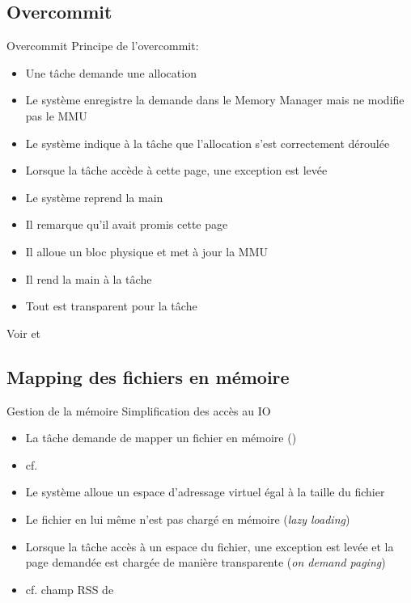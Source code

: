 \subsection{Overcommit}

\begin{frame}{Overcommit}
  Principe de l'overcommit:
  \begin{itemize}
  \item Une tâche demande une allocation
  \item Le système  enregistre la demande dans le  Memory Manager mais
    ne modifie pas le MMU
  \item  Le  système  indique   à  la  tâche  que  l'allocation  s'est
    correctement déroulée
  \item Lorsque la tâche accède à cette page, une exception est levée
  \item Le système reprend la main
  \item Il remarque qu'il avait promis cette page
  \item Il alloue un bloc physique et met à jour la MMU
  \item Il rend la main à la tâche
  \item Tout est transparent pour la tâche
  \end{itemize}
  Voir                         et
\end{frame}

\subsection{Mapping des fichiers en mémoire}

\begin{frame}{Gestion de la mémoire}
  Simplification des accès au IO
  \begin{itemize}
  \item   La  tâche   demande  de   mapper  un   fichier   en  mémoire
    ()
  \item cf. 
  \item  Le système  alloue un  espace d'adressage  virtuel égal  à la
    taille du fichier
  \item Le fichier en lui même n'est pas chargé en mémoire (\emph{lazy
      loading})
  \item Lorsque la  tâche accès à un espace  du fichier, une exception
    est levée et la page  demandée est chargée de manière transparente
    (\emph{on demand paging})
  \item cf. champ RSS de 
  \end{itemize}
\end{frame}

